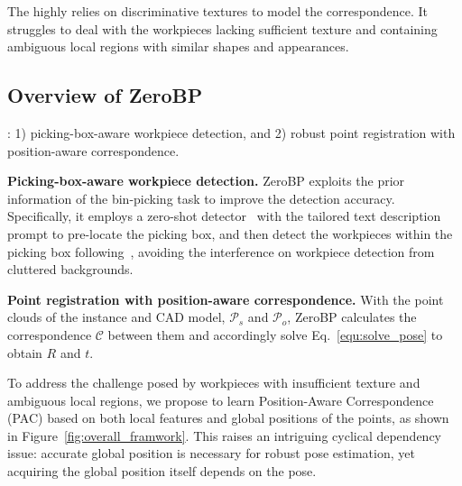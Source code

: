 The  highly relies on discriminative textures to model the correspondence. It struggles to deal with the workpieces lacking sufficient texture and containing ambiguous local regions with similar shapes and appearances.


\subsection{Overview of ZeroBP}
: 1) picking-box-aware workpiece detection, and 2) robust point registration with position-aware correspondence.

\vspace{1mm}
\noindent\textbf{Picking-box-aware workpiece detection.}
ZeroBP exploits the prior information of the bin-picking task to improve the detection accuracy. Specifically, it employs a zero-shot detector~\cite{groundingdino} with the tailored text description prompt to pre-locate the picking box, and then detect the workpieces within the picking box following~\cite{chen2023zeropose}, avoiding the interference on workpiece detection from cluttered backgrounds.



\vspace{1mm}
\noindent\textbf{Point registration with position-aware correspondence.} With the point clouds of the instance and CAD model, $\mathcal{P}_s$ and $\mathcal{P}_o$, ZeroBP calculates the correspondence $\mathcal{C}$ between them and accordingly solve Eq.~\eqref{equ:solve_pose} to obtain $R$ and $t$. 

To address the challenge posed by workpieces with insufficient texture and ambiguous local regions, we propose to learn Position-Aware Correspondence (PAC) based on both local features and global positions of the points, as shown in Figure~\ref{fig:overall_framwork}.  This raises an intriguing cyclical dependency issue: accurate global position is necessary for robust pose estimation, yet acquiring the global position itself depends on the pose. 

